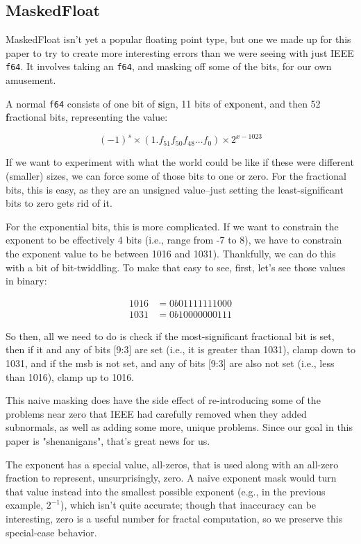 \documentclass[sigconf,authorversion,nonacm]{acmart}
\begin{document}
\setcounter{subsection}{124}
\subsection{MaskedFloat}

MaskedFloat isn’t yet a popular floating point type, but one we made up for this paper to try to create more interesting errors
than we were seeing with just IEEE \texttt{f64}.
It involves taking an \texttt{f64}, and masking off some of the bits, for our own amusement.

A normal \texttt{f64} consists of one bit of \textbf{s}ign, 11 bits of e\textbf{x}ponent, and then 52 \textbf{f}ractional bits, representing the value:

$$
(-1)^{s} \times (1.f_{51} f_{50} f_{48} ... f_0 ) \times 2^{x - 1023}
$$

If we want to experiment with what the world could be like if these were different (smaller) sizes, we can force some of those bits to one or zero.
For the fractional bits, this is easy, as they are an unsigned value--just setting the least-significant bits to zero gets rid of it.

For the exponential bits, this is more complicated. If we want to constrain the exponent to be effectively 4 bits (i.e., range from -7 to 8), we have to constrain the exponent value to be between 1016 and 1031).  Thankfully, we can do this with a bit of bit-twiddling. To make that easy to see, first, let’s see those values in binary:

\begin{align*}
1016 &= 0b01111111000 \\
1031 &= 0b10000000111
\end{align*}

So then, all we need to do is check if the most-significant fractional bit is set, then if it and any of bits [9:3] are set (i.e., it is greater than 1031), clamp down to 1031, and if the msb is not set, and any of bits [9:3] are also not set (i.e., less than 1016), clamp up to 1016.

This naive masking does have the side effect of re-introducing some of the problems near zero that IEEE had carefully removed when they added subnormals, as well as adding some more, unique problems. Since our goal in this paper is "shenanigans", that's great news for us.

The exponent has a special value, all-zeros, that is used along with an all-zero fraction to represent, unsurprisingly, zero. 
A naive exponent mask would turn that value instead into the smallest possible exponent (e.g., in the previous example, $2^{-1}$), which isn't quite accurate;  though that inaccuracy can be interesting, zero is a useful number for fractal computation, so we preserve this special-case behavior.
\end{document}
